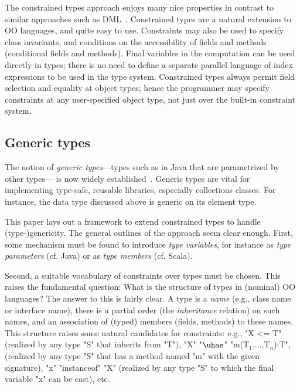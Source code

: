 The constrained types approach enjoys many nice properties in contrast
to similar approaches such as DML~\cite{xi99dependent}.  Constrained
types are a natural extension to OO languages, and quite easy to
use. Constraints may also be used to specify class invariants, and
conditions on the accessibility of fields and methods (conditional
fields and methods).  Final variables in the computation can be used
directly in types; there is no need to define a separate
parallel language of index expressions to be used in the type system.
Constrained types always
permit field selection and equality at object types; hence the
programmer may specify constraints at any user-specified object type,
not just over the built-in constraint system.  

\subsection{Generic types}
The notion of \emph{generic types}---types such as  in
Java that are parametrized by other types--- is now widely
established~\cite{clu,ada,GJ,java-popl97,thorup97,Java3,csharp-generics}.
Generic types are vital for implementing type-safe, reusable
libraries, especially collections classes.  For instance, the data
type  discussed above is generic on its element type.

This paper lays out a framework to extend constrained types to handle
(type-)genericity. The general outlines of the approach seem clear
enough. First, some mechanism must be found to introduce {\em type
variables}, for instance as {\em type parameters} (cf. Java) or as
{\em type members} (cf. Scala). 

Second, a suitable vocabulary of constraints over types must be
chosen. This raises the fundamental question: What is the structure of
types in (nominal) OO languages?  The answer to this is fairly
clear. A type is a {\em name} (e.g., class name or interface name),
there is a partial order (the {\em inheritance} relation) on such
names, and an association of (typed) members (fields, methods) to
these names. This structure raises some natural candidates for
constraints: e.g., \xcd"X <= T" (realized by any type \xcd"S" that
inherits from \xcd"T"), \xcd"X" \xcdmath"$\uhas$"
\xcdmath"m(T$_1$,$\ldots$,T$_n$):T", (realized by
any type \xcd"S" that has a method named \xcd"m" with the given
signature), \xcd"x" \xcd"instanceof" \xcd"X" (realized by any type
\xcd"S" to which the final variable 
\xcd"x" can be cast), etc. 


